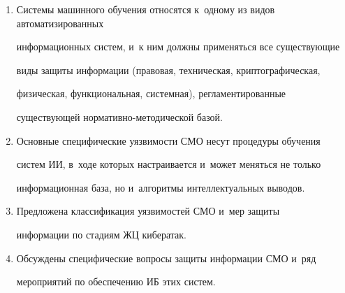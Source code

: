 \vspace*{-4pt}



\noindent

\begin{enumerate}[1.]

\item Системы машинного обучения относятся к~одному из видов автоматизированных 

информационных систем, и~к ним должны применяться все су\-щест\-ву\-ющие 

виды защиты информации (правовая, техническая, криптографическая, 

физическая, функциональная, системная), регламентированные 

существующей нор\-ма\-тив\-но-ме\-то\-ди\-че\-ской базой.

\item Основные специфические уязвимости СМО несут процедуры обуче\-ния 

сис\-тем ИИ, в~ходе которых настраивается и~может меняться не только 

информационная база, но и~алгоритмы интеллектуальных выводов.

\item Предложена классификация уязвимостей СМО и~мер защиты 

информации по стадиям ЖЦ кибератак. 

\item Обсуждены специфические вопросы защиты информации СМО и~ряд 

мероприятий по обеспечению ИБ этих сис\-тем. 

\end{enumerate}



\vspace*{-8pt}



